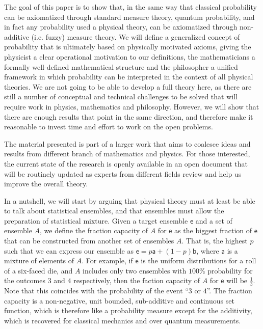 \documentclass[10pt,twocolumn, nofootinbib]{revtex4-2}
\newcommand{\ens}[1][e] {\mathsf{#1}} %
\begin{document}
The goal of this paper is to show that, in the same way that classical probability can be axiomatized through standard measure theory, quantum probability, and in fact any probability used a physical theory, can be axiomatized through non-additive (i.e. fuzzy) measure theory. We will define a generalized concept of probability that is ultimately based on physically motivated axioms, giving the physicist a clear operational motivation to our definitions, the mathematicians a formally well-defined mathematical structure and the philosopher a unified framework in which probability can be interpreted in the context of all physical theories. We are not going to be able to develop a full theory here, as there are still a number of conceptual and technical challenges to be solved that will require work in physics, mathematics and philosophy. However, we will show that there are enough results that point in the same direction, and therefore make it reasonable to invest time and effort to work on the open problems.

The material presented is part of a larger work that aims to coalesce ideas and results from different branch of mathematics and physics. For those interested, the current state of the research is openly available in an open document that will be routinely updated as experts from different fields review and help us improve the overall theory.

In a nutshell, we will start by arguing that physical theory must at least be able to talk about statistical ensembles, and that ensembles must allow the preparation of statistical mixture. Given a target ensemble $\ens$ and a set of ensemble $A$, we define the fraction capacity of $A$ for $\ens$ as the biggest fraction of $\ens$ that can be constructed from another set of ensembles $A$. That is, the highest $p$ such that we can express our ensemble as $\ens = p \ens[a] + (1-p) \ens[b]$, where $\ens[a]$ is a mixture of elements of $A$. For example, if $\ens$ is the uniform distributions for a roll of a six-faced die, and $A$ includes only two ensembles with $100\%$ probability for the outcomes $3$ and $4$ respectively, then the faction capacity of $A$ for $\ens$ will be $\frac{1}{3}$. Note that this coincides with the probability of the event ``$3$ or $4$''. The fraction capacity is a non-negative, unit bounded, sub-additive and continuous set function, which is therefore like a probability measure except for the additivity, which is recovered for classical mechanics and over quantum measurements.
\end{document}
